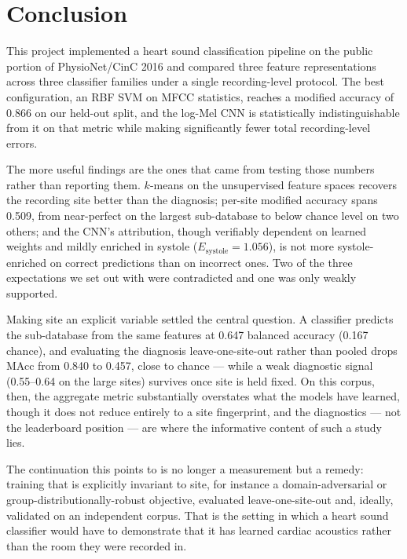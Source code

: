 \section{Conclusion}

This project implemented a heart sound classification pipeline on the public
portion of PhysioNet/CinC 2016 and compared three feature representations across
three classifier families under a single recording-level protocol. The best
configuration, an RBF SVM on MFCC statistics, reaches a modified accuracy of
\num{0.866} on our held-out split, and the log-Mel CNN is statistically
indistinguishable from it on that metric while making significantly fewer total
recording-level errors.

The more useful findings are the ones that came from testing those numbers
rather than reporting them. $k$-means on the unsupervised feature spaces
recovers the recording site better than the diagnosis; per-site modified
accuracy spans \num{0.509}, from near-perfect on the largest sub-database to
below chance level on two others; and the CNN's attribution, though verifiably
dependent on learned weights and mildly enriched in systole
($E_\text{systole} = \num{1.056}$), is not more systole-enriched on correct
predictions than on incorrect ones. Two of the three expectations we set out
with were contradicted and one was only weakly supported.

Making site an explicit variable settled the central question. A classifier
predicts the sub-database from the same features at \num{0.647} balanced
accuracy (\num{0.167} chance), and evaluating the diagnosis leave-one-site-out rather than pooled
drops MAcc from \num{0.840} to \num{0.457}, close to chance --- while a weak
diagnostic signal (\num{0.55}--\num{0.64} on the large sites) survives once site
is held fixed. On this corpus, then, the aggregate metric substantially
overstates what the models have learned, though it does not reduce entirely to a
site fingerprint, and the diagnostics --- not the leaderboard position --- are
where the informative content of such a study lies.

The continuation this points to is no longer a measurement but a remedy: training
that is explicitly invariant to site, for instance a domain-adversarial or
group-distributionally-robust objective, evaluated leave-one-site-out and,
ideally, validated on an independent corpus. That is the setting in which a heart
sound classifier would have to demonstrate that it has learned cardiac acoustics
rather than the room they were recorded in.
